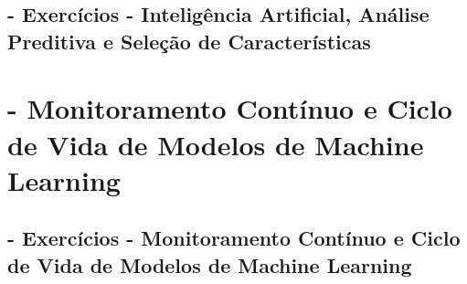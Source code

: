 \documentclass[
]{book}
\begin{document}
\section{- Exercícios - Inteligência Artificial, Análise Preditiva e Seleção de Características}\label{exercuxedcios---inteliguxeancia-artificial-anuxe1lise-preditiva-e-seleuxe7uxe3o-de-caracteruxedsticas}

\chapter{- Monitoramento Contínuo e Ciclo de Vida de Modelos de Machine Learning}\label{monitoramento-contuxednuo-e-ciclo-de-vida-de-modelos-de-machine-learning}

\section{- Exercícios - Monitoramento Contínuo e Ciclo de Vida de Modelos de Machine Learning}\label{exercuxedcios---monitoramento-contuxednuo-e-ciclo-de-vida-de-modelos-de-machine-learning}


\end{document}
